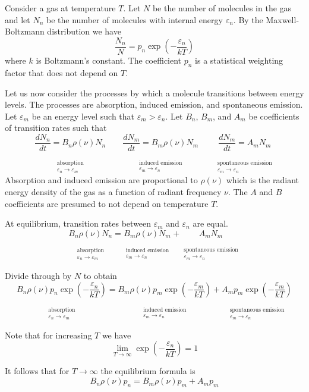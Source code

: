 \documentclass[12pt]{article}
\newcommand\BNM{B_n} %
\newcommand\BMN{B_m} %
\newcommand\AMN{A_m} %
\newcommand\ABSORPTION{\substack{\phantom{0}\\ \text{absorption}\\ \varepsilon_n\rightarrow\varepsilon_m}}
\newcommand\INDUCED{\substack{\phantom{0}\\ \text{induced emission}\\ \varepsilon_m\rightarrow\varepsilon_n}}
\newcommand\SPONTANEOUS{\substack{\phantom{0}\\ \text{spontaneous emission}\\ \varepsilon_m\rightarrow\varepsilon_n}}
\begin{document}
\noindent
Consider a gas at temperature $T$.
Let $N$ be the number of molecules in the gas
and let $N_n$ be the number of molecules with internal energy $\varepsilon_n$.
By the Maxwell-Boltzmann distribution we have
\begin{equation*}
\frac{N_n}{N}=p_n\exp\left(-\frac{\varepsilon_n}{kT}\right)
\end{equation*}
where $k$ is Boltzmann's constant.
The coefficient $p_n$ is a statistical weighting factor that does not depend on $T$.

\bigskip
\noindent
Let us now consider the processes by which a molecule transitions between energy levels.
The processes are absorption, induced emission, and spontaneous emission.
Let $\varepsilon_m$ be an energy level such that $\varepsilon_m>\varepsilon_n$.
Let $\BNM$, $\BMN$, and $\AMN$ be coefficients of transition rates such that
\begin{equation*}
\underset{\ABSORPTION}{\frac{dN_n}{dt}=\BNM\rho(\nu)N_n}
\qquad
\underset{\INDUCED}{\frac{dN_m}{dt}=\BMN\rho(\nu)N_m}
\qquad
\underset{\SPONTANEOUS}{\frac{dN_m}{dt}=\AMN N_m}
\end{equation*}
Absorption and induced emission are proportional to $\rho(\nu)$
which is the radiant energy density of the gas
as a function of radiant frequency $\nu$.
The $A$ and $B$ coefficients are presumed to not depend on temperature $T$.

\bigskip
\noindent
At equilibrium, transition rates between $\varepsilon_m$ and $\varepsilon_n$ are equal.
\begin{equation*}
\underset{\ABSORPTION}{\BNM\rho(\nu)N_n}
=\underset{\INDUCED}{\BMN\rho(\nu)N_m}
+\underset{\SPONTANEOUS}{\AMN N_m}
\end{equation*}

\noindent
Divide through by $N$ to obtain
\begin{equation*}
\underset{\ABSORPTION}{\BNM\rho(\nu)p_n\exp\left(-\frac{\varepsilon_n}{kT}\right)}
=\underset{\INDUCED}{\BMN\rho(\nu)p_m\exp\left(-\frac{\varepsilon_m}{kT}\right)}
+\underset{\SPONTANEOUS}{\AMN p_m\exp\left(-\frac{\varepsilon_m}{kT}\right)}
\end{equation*}

\noindent
Note that for increasing $T$ we have
\begin{equation*}
\lim_{T\rightarrow\infty}\exp\left(-\frac{\varepsilon_n}{kT}\right)=1
\end{equation*}

\noindent
It follows that for $T\rightarrow\infty$ the equilibrium formula is
\begin{equation*}
\BNM\rho(\nu)p_n
=\BMN\rho(\nu)p_m
+\AMN p_m
\end{equation*}
\end{document}
